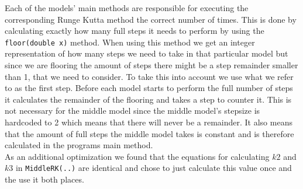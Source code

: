 Each of the models' main methods are responsible for executing the corresponding Runge Kutta method the correct number of times. This is done by calculating exactly how many full steps it needs to perform by using the \texttt{floor(double x)} method. When using this method we get an integer representation of how many steps we need to take in that particular model but since we are flooring the amount of steps there might be a step remainder smaller than 1, that we need to consider. To take this into account we use what we refer to as the first step. Before each model starts to perform the full number of steps it calculates the remainder of the flooring and takes a step to counter it. 
This is not necessary for the middle model since the middle model's stepsize is hardcoded to 2 which means that there will never be a remainder. It also means that the amount of full steps the middle model takes is constant and is therefore calculated in the programs main method. \\

As an additional optimization we found that the equations for calculating $k2$ and $k3$ in \texttt{MiddleRK(..)} are identical and chose to just calculate this value once and the use it both places. 
